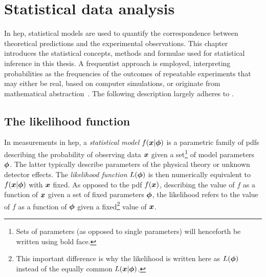 

\chapter{Statistical data analysis}\label{ch:statistics}

\graphicspath{{chapter-statistics/Figs/Vector/}{chapter-statistics/Figs/}}

In \gls{hep}, statistical models are used to quantify the correspondence between theoretical predictions and the experimental observations.
This chapter introduces the statistical concepts, methods and formulae used for statistical inference in this thesis.
A frequentist approach is employed, interpreting probabilities as the frequencies of the outcomes of repeatable experiments that may either be real, based on computer simulations, or originate from mathematical abstraction~\cite{pdg2020}.
The following description largely adheres to \cite{Cranmer:2015nia, Cowan:2010js}.

\section{The likelihood function}\label{sec:likelihood_function}
 
In measurements in \gls{hep}, a \textit{statistical model} $f(\makemebold{x}\vert\makemebold{\phi})$ is a parametric family of \glspl{pdf} describing the probability of observing data $\makemebold{x}$ given a set\footnote{Sets of parameters (as opposed to single parameters) will henceforth be written using bold face.} of model parameters $\makemebold{\phi}$.
The latter typically describe parameters of the physical theory or unknown detector effects. The \textit{likelihood function} $L(\makemebold{\phi})$ is then numerically equivalent to $f(\makemebold{x}\vert\makemebold{\phi})$ with $\makemebold{x}$ fixed.
As opposed to the \gls{pdf} $f(\makemebold{x})$, describing the value of $f$ as a function of $\makemebold{x}$ given a set of fixed parameters $\makemebold{\phi}$, the likelihood refers to the value of $f$ as a function of $\makemebold{\phi}$ given a fixed\footnote{This important difference is why the likelihood is written here as $L(\makemebold{\phi})$ instead of the equally common $L(\makemebold{x}\vert\makemebold{\phi})$.} value of $\makemebold{x}$.

